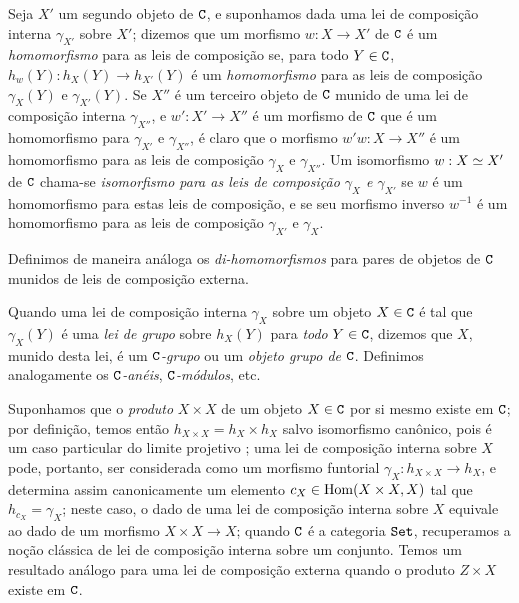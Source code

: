\begin{env}[8.2.2]
\label{0.8.2.2}
Seja $X'$ um segundo objeto de $\mathtt{C}$, e suponhamos dada uma lei de composição interna $\gamma_{X'}$ sobre $X'$; dizemos que um morfismo $w:X\to X'$ de $\mathtt{C}$ é um \emph{homomorfismo} para as leis de composição se, para todo $Y\in\mathtt{C}$, $h_w(Y):h_X(Y)\to h_{X'}(Y)$ é um \emph{homomorfismo} para as leis de composição $\gamma_X(Y)$ e $\gamma_{X'}(Y)$.
Se $X''$ é um terceiro
objeto de $\mathtt{C}$ munido de uma lei de composição interna $\gamma_{X''}$, e $w':X'\to X''$ é um morfismo de $\mathtt{C}$ que é um homomorfismo para $\gamma_{X'}$ e $\gamma_{X''}$, é claro que o morfismo $w'w:X\to X''$ é um homomorfismo para as leis de composição $\gamma_X$ e $\gamma_{X''}$.
Um isomorfismo $w:X\simeq X'$ de $\mathtt{C}$ chama-se \emph{isomorfismo para as leis de composição $\gamma_X$ e $\gamma_{X'}$} se $w$ é um homomorfismo para estas leis de composição, e se seu morfismo inverso $w^{-1}$ é um homomorfismo para as leis de composição $\gamma_{X'}$ e $\gamma_X$.

Definimos de maneira análoga os \emph{di-homomorfismos} para pares de objetos de $\mathtt{C}$ munidos de leis de composição externa.
\end{env}

\begin{env}[8.2.3]
\label{0.8.2.3}
Quando uma lei de composição interna $\gamma_X$ sobre um objeto $X\in\mathtt{C}$ é tal que $\gamma_X(Y)$ é uma \emph{lei de grupo} sobre $h_X(Y)$ para \emph{todo} $Y\in\mathtt{C}$, dizemos que $X$, munido desta lei, é um \emph{$\mathtt{C}$-grupo} ou um \emph{objeto grupo de $\mathtt{C}$}.
Definimos analogamente os \emph{$\mathtt{C}$-anéis}, \emph{$\mathtt{C}$-módulos}, etc.
\end{env}

\begin{env}[8.2.4]
\label{0.8.2.4}
Suponhamos que o \emph{produto} $X\times X$ de um objeto $X\in\mathtt{C}$ por si mesmo existe em $\mathtt{C}$; por definição, temos então $h_{X\times X}=h_X\times h_X$ salvo isomorfismo canônico, pois é um caso particular do limite projetivo ; uma lei de composição interna sobre $X$ pode, portanto, ser considerada como um morfismo funtorial $\gamma_X:h_{X\times X}\to h_X$, e determina assim canonicamente  um elemento $c_X\in\operatorname{Hom}(X\times X,X)$ tal que $h_{c_X}=\gamma_X$; neste caso, o dado de uma lei de composição interna sobre $X$ equivale ao dado de um morfismo $X\times X\to X$; quando $\mathtt{C}$ é a categoria $\mathtt{Set}$, recuperamos a noção clássica de lei de composição interna sobre um conjunto.
Temos um resultado análogo para uma lei de composição externa quando o produto $Z\times X$ existe em $\mathtt{C}$.
\end{env}

